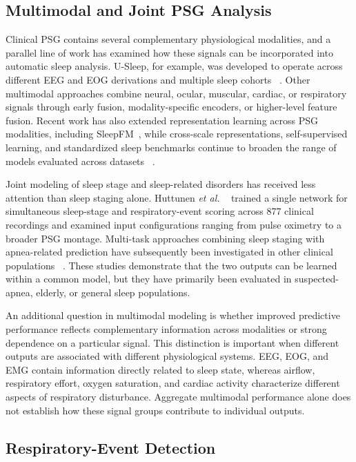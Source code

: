 \documentclass{ieeeaccess}
\begin{document}
\subsection{Multimodal and Joint PSG Analysis}

Clinical PSG contains several complementary physiological modalities, and a
parallel line of work has examined how these signals can be incorporated into
automatic sleep analysis. U-Sleep, for example, was developed to operate across
different EEG and EOG derivations and multiple sleep cohorts
~\cite{perslev2021usleep}. Other multimodal approaches combine neural, ocular,
muscular, cardiac, or respiratory signals through early fusion,
modality-specific encoders, or higher-level feature fusion. Recent work has
also extended representation learning across PSG modalities, including
SleepFM~\cite{sleepfm2026}, while cross-scale representations,
self-supervised learning, and standardized sleep benchmarks continue to broaden
the range of models evaluated across datasets
~\cite{csbrain2025,sleepyland2026,estevan2025ssl}.

Joint modeling of sleep stage and sleep-related disorders has received less
attention than sleep staging alone. Huttunen \emph{et al.}
~\cite{huttunen2023simultaneous} trained a single network for simultaneous
sleep-stage and respiratory-event scoring across 877 clinical recordings and
examined input configurations ranging from pulse oximetry to a broader PSG
montage. Multi-task approaches combining sleep staging with apnea-related
prediction have subsequently been investigated in other clinical populations
~\cite{multitask2025elderly}. These studies demonstrate that the two outputs can
be learned within a common model, but they have primarily been evaluated in
suspected-apnea, elderly, or general sleep populations.

An additional question in multimodal modeling is whether improved predictive
performance reflects complementary information across modalities or strong
dependence on a particular signal. This distinction is important when different
outputs are associated with different physiological systems. EEG, EOG, and EMG
contain information directly related to sleep state, whereas airflow,
respiratory effort, oxygen saturation, and cardiac activity characterize
different aspects of respiratory disturbance. Aggregate multimodal performance
alone does not establish how these signal groups contribute to individual
outputs.

\subsection{Respiratory-Event Detection}
\end{document}
